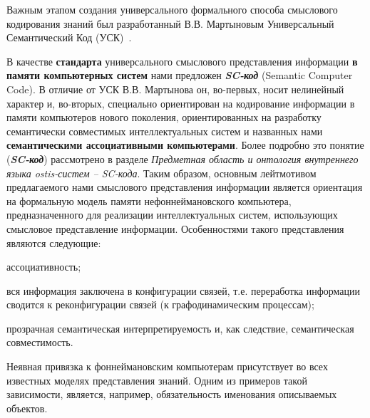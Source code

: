 \begin{SCn}
{Важным этапом создания универсального формального способа смыслового кодирования знаний был разработанный В.В. Мартыновым Универсальный Семантический Код (УСК)~\cite{Martynov}.

В качестве \textbf{стандарта} универсального смыслового представления информации \textbf{в памяти компьютерных систем} нами предложен \textbf{\textit{SC-код}} (Semantic Computer Code). В отличие от УСК В.В. Мартынова он, во-первых, носит нелинейный характер и, во-вторых, специально ориентирован на кодирование информации в памяти компьютеров нового поколения, ориентированных на разработку семантически совместимых интеллектуальных систем и названных нами \textbf{семантическими ассоциативными компьютерами}. Более подробно это понятие (\textbf{\textit{SC-код}}) рассмотрено в разделе \textit{Предметная область и онтология внутреннего языка ostis-систем -- SC-кода}. Таким образом, основным лейтмотивом предлагаемого нами смыслового представления информации является ориентация на формальную модель памяти нефоннеймановского компьютера, предназначенного для реализации интеллектуальных систем, использующих смысловое представление информации. Особенностями такого представления являются следующие:
\begin{scnitemize}
    \item ассоциативность;
    \item вся информация заключена в конфигурации связей, т.е. переработка информации сводится к реконфигурации связей (к графодинамическим процессам);
    \item прозрачная семантическая интерпретируемость и, как следствие, семантическая совместимость.
\end{scnitemize}

Неявная привязка к фоннеймановским компьютерам присутствует во всех известных моделях представления знаний. Одним из примеров такой зависимости, является, например, обязательность именования описываемых объектов.}


\end{SCn}

